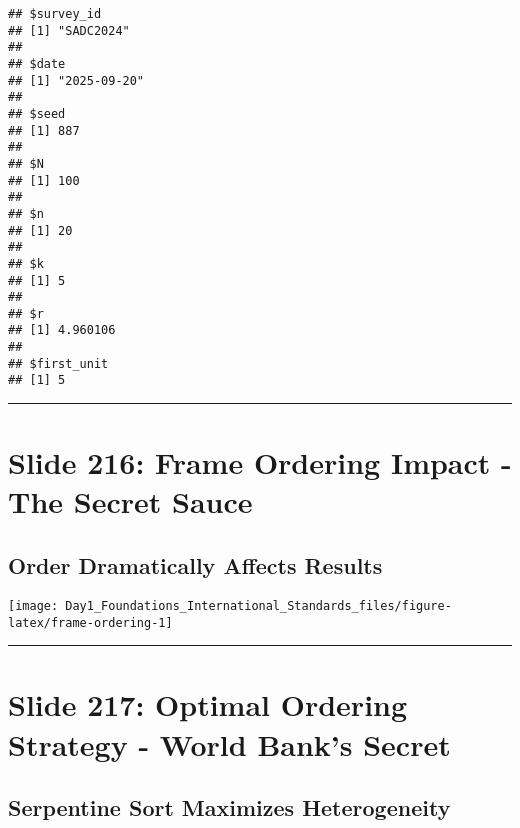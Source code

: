 \documentclass[
]{article}
\begin{document}
\begin{verbatim}
## $survey_id
## [1] "SADC2024"
## 
## $date
## [1] "2025-09-20"
## 
## $seed
## [1] 887
## 
## $N
## [1] 100
## 
## $n
## [1] 20
## 
## $k
## [1] 5
## 
## $r
## [1] 4.960106
## 
## $first_unit
## [1] 5
\end{verbatim}

\begin{center}\rule{0.5\linewidth}{0.5pt}\end{center}

\section{Slide 216: Frame Ordering Impact - The Secret
Sauce}\label{slide-216-frame-ordering-impact---the-secret-sauce}

\subsection{Order Dramatically Affects
Results}\label{order-dramatically-affects-results}

\texttt{[image: Day1\_Foundations\_International\_Standards\_files/figure-latex/frame-ordering-1]}

\begin{center}\rule{0.5\linewidth}{0.5pt}\end{center}

\section{Slide 217: Optimal Ordering Strategy - World Bank's
Secret}\label{slide-217-optimal-ordering-strategy---world-banks-secret}

\subsection{Serpentine Sort Maximizes
Heterogeneity}\label{serpentine-sort-maximizes-heterogeneity}
\end{document}
